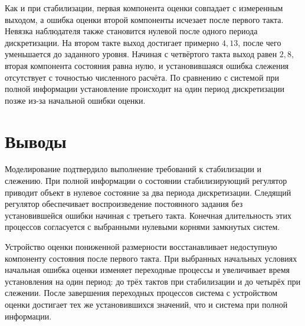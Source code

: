 Как и при стабилизации, первая компонента оценки совпадает с измеренным
выходом, а ошибка оценки второй компоненты исчезает после первого такта.
Невязка наблюдателя также становится нулевой после одного периода
дискретизации. На втором такте выход достигает примерно $4{,}13$,
после чего уменьшается до заданного уровня. Начиная с четвёртого такта
выход равен $2{,}8$, вторая компонента состояния равна нулю,
и установившаяся ошибка слежения отсутствует с точностью численного расчёта.
По сравнению с системой при полной информации установление происходит
на один период дискретизации позже из-за начальной ошибки оценки.

\section{Выводы}

Моделирование подтвердило выполнение требований к стабилизации
и слежению. При полной информации о состоянии стабилизирующий регулятор
приводит объект в нулевое состояние за два периода дискретизации.
Следящий регулятор обеспечивает воспроизведение постоянного задания
без установившейся ошибки начиная с третьего такта. Конечная длительность
этих процессов согласуется с выбранными нулевыми корнями замкнутых систем.

Устройство оценки пониженной размерности восстанавливает недоступную
компоненту состояния после первого такта. При выбранных начальных условиях
начальная ошибка оценки изменяет переходные процессы и увеличивает
время установления на один период: до трёх тактов при стабилизации
и до четырёх при слежении. После завершения переходных процессов
система с устройством оценки достигает тех же установившихся значений,
что и система при полной информации.
